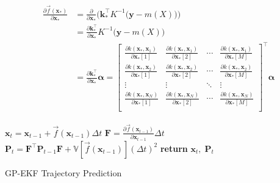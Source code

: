 \begin{align}\label{eq:gp_jacobian}
\begin{split}
    \frac{\partial \vec{f}(\boldsymbol{x}_*)}{\partial \boldsymbol{x}_*} &= \frac{\partial}{\partial \boldsymbol{x}_*} \bigg(\boldsymbol{k}_*^\intercal K^{-1} \big(\boldsymbol{y} - m(X)\big)\bigg)\\
    &= \frac{\partial \boldsymbol{k}_*^\intercal}{\partial \boldsymbol{x}_*} K^{-1} \big(\boldsymbol{y} - m(X)\big)\\ 
    &= \frac{\partial \boldsymbol{k}_*^\intercal}{\partial \boldsymbol{x}_*} \boldsymbol{\alpha} = \begin{bmatrix} 
    \frac{\partial k(\boldsymbol{x}_*, \boldsymbol{x}_1)}{\partial \boldsymbol{x}_*[1]} &  \frac{\partial k(\boldsymbol{x}_*, \boldsymbol{x}_1)}{\partial \boldsymbol{x}_*[2]} & \cdots & \frac{\partial k(\boldsymbol{x}_*, \boldsymbol{x}_1)}{\partial \boldsymbol{x}_*[M]} \\
    \frac{\partial k(\boldsymbol{x}_*, \boldsymbol{x}_2)}{\partial \boldsymbol{x}_*[1]} &  \frac{\partial k(\boldsymbol{x}_*, \boldsymbol{x}_2)}{\partial \boldsymbol{x}_*[2]} & \cdots & \frac{\partial k(\boldsymbol{x}_*, \boldsymbol{x}_2)}{\partial \boldsymbol{x}_*[M]} \\
    \vdots & \vdots & \ddots & \vdots\\
    \frac{\partial k(\boldsymbol{x}_*, \boldsymbol{x}_N)}{\partial \boldsymbol{x}_*[1]} &  \frac{\partial k(\boldsymbol{x}_*, \boldsymbol{x}_N)}{\partial \boldsymbol{x}_*[2]} & \cdots & \frac{\partial k(\boldsymbol{x}_*, \boldsymbol{x}_N)}{\partial \boldsymbol{x}_*[M]} \\
    \end{bmatrix}^\intercal \boldsymbol{\alpha}
\end{split}
\end{align}

\begin{algorithm}[h]
\begin{algorithmic}[1]
    \State $\boldsymbol{x}_{t} = \boldsymbol{x}_{t-1} + \vec{f}(\boldsymbol{x}_{t-1}) \Delta t$
    \State $\boldsymbol{F} = \frac{\partial \vec{f}(\boldsymbol{x}_{t-1})}{\partial \boldsymbol{x}_{t-1}} \Delta t$
    \State $\boldsymbol{P}_t = \boldsymbol{F}^\intercal \boldsymbol{P}_{t-1} \boldsymbol{F} +\mathbb{V}[\vec{f}(\boldsymbol{x}_{t-1})] (\Delta t)^2$
    \State \textbf{return} $\boldsymbol{x}_t, \; \boldsymbol{P}_t$
\EndProcedure
\end{algorithmic}
\caption{GP-EKF Trajectory Prediction}
\label{alg:gp_ekf_prediction}
\end{algorithm}

